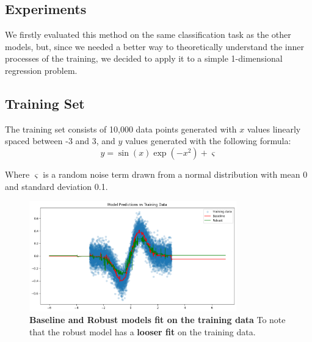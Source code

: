 \subsection{Experiments}
We firstly evaluated this method on the same classification task as the other models, but, since we needed a better way to theoretically understand the inner processes of the training, we decided to apply it to a simple 1-dimensional regression problem.

\subsection{Training Set}
The training set consists of 10,000 data points generated with $x$ values linearly spaced between -3 and 3, and $y$ values generated with the following formula:
\begin{equation}
    y = \sin(x)\exp(-x^2) + \varsigma
\end{equation}

Where $\varsigma$ is a random noise term drawn from a normal distribution with mean 0 and standard deviation 0.1.

\begin{figure}[H]
    \centering
    \includegraphics[width=0.8\textwidth]{assets/fit_on_train.png} 
    \caption{\textbf{Baseline and Robust models fit on the training data} To note that the robust model has a \textbf{looser fit} on the training data.}
    \label{fig:fit-train}
\end{figure}

